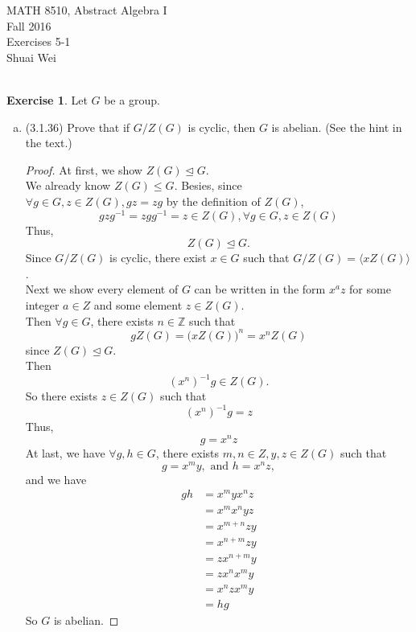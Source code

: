 \documentclass[14pt]{amsart}
\newcommand{\bbz}{\mathbb{Z}}
\theoremstyle{plain}
\theoremstyle{definition}
\newtheorem{exer}[lem]{Exercise}
\begin{document}
\noindent MATH 8510, Abstract Algebra I \\
Fall 2016\\
Exercises 5-1\\
Shuai Wei\\

\

%
%

\begin{exer}
Let $G$ be a group.
\begin{enumerate}[(a)]
\item (3.1.36) Prove that if $G/Z(G)$ is cyclic, then $G$ is abelian. (See the hint in the text.)
  \begin{proof}	
	At first, we show $Z(G) \unlhd G$.\\
	We already know $Z(G) \leq G$. Besies, since\\
	$\forall g \in G, z \in Z(G) , gz = zg$ by the definition of $Z(G)$,
   	\[ gzg^{-1} = zgg^{-1} = z \in Z(G), \forall g\in G, z\in Z(G) \] 
	Thus,
	\[Z(G) \unlhd G.\]
	Since $G/Z(G)$ is cyclic, there exist $x \in G$ such that $G/Z(G) =\langle xZ(G) \rangle$.\\
	Next we show every element of $G$ can be written in the form $x^az$ for some integer $a\in Z$ and some element $z \in Z(G)$.\\
	Then $\forall g \in G$, there exists $n \in \bbz$ such that
  	\[gZ(G) = \big(xZ(G)\big)^n = x^nZ(G) \]
	since $Z(G) \unlhd G $.\\
	Then 
	\[(x^n)^{-1}g \in Z(G).\]
	So there exists $z \in Z(G)$ such that
	\[(x^n)^{-1}g = z\]
	Thus,
	\[ g = x^nz\]
	At last, we have $\forall g,h \in G$, there exists $ m,n \in Z, y,z\in Z(G)$ such that
  	\[g= x^my, \text { and } h = x^nz,\]
	 and we have 
	 \begin{align*}
  		 gh &= x^myx^nz \\
		 	&=x^mx^nyz\\
			&=x^{m+n}zy\\
			&=x^{n+m}zy\\
			&=zx^{n+m}y\\
			&=zx^nx^my\\
			&=x^nzx^my\\
			&=hg
  	 \end{align*}
	So $G$ is abelian.
	
  \end{proof}  	  


\end{enumerate}
\end{exer}
\end{document}
